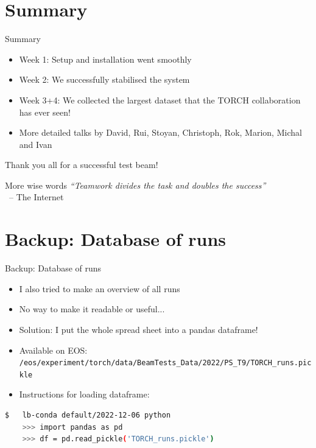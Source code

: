 \documentclass[xcolor = table]{beamer}
\begin{document}
\section{Summary}
\begin{frame}{Summary}
  \begin{itemize}
    \setlength\itemsep{1.0em}
    \item{Week 1: Setup and installation went smoothly}
    \item{Week 2: We successfully stabilised the system}
    \item{Week 3+4: We collected the largest dataset that the TORCH collaboration has ever seen!}
    \item{More detailed talks by David, Rui, Stoyan, Christoph, Rok, Marion, Michal and Ivan}
  \end{itemize}
  \begin{center}
    \huge Thank you all for a successful test beam!
  \end{center}
  \begin{block}{More wise words}
    \textit{``Teamwork divides the task and doubles the success''}\\~\quad\quad-- The Internet
  \end{block}
\end{frame}

\section{Backup: Database of runs}
\begin{frame}[fragile]{Backup: Database of runs}
  \begin{itemize}
    \setlength\itemsep{0.5em}
    \item{I also tried to make an overview of all runs}
    \item{No way to make it readable or useful...}
    \item{Solution: I put the whole spread sheet into a pandas dataframe!}
    \item{Available on EOS: \texttt{\tiny/eos/experiment/torch/data/BeamTests\_Data/2022/PS\_T9/TORCH\_runs.pickle}}
    \item{Instructions for loading dataframe:}
  \end{itemize}
  \vspace{0.3cm}
  \begin{lstlisting}[language=bash]
    $   lb-conda default/2022-12-06 python
    >>> import pandas as pd
    >>> df = pd.read_pickle('TORCH_runs.pickle')
  \end{lstlisting}
\end{frame}
\end{document}
